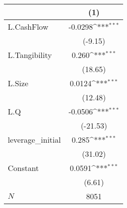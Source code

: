 {
\def\sym#1{\ifmmode^{#1}\else\(^{#1}\)\fi}
\begin{tabular}{l*{1}{c}}
\hline\hline
            &\multicolumn{1}{c}{(1)}         \\
\hline
L.CashFlow  &     -0.0298\sym{***}\\
            &     (-9.15)         \\
L.Tangibility&       0.260\sym{***}\\
            &     (18.65)         \\
L.Size      &      0.0124\sym{***}\\
            &     (12.48)         \\
L.Q         &     -0.0506\sym{***}\\
            &    (-21.53)         \\
leverage\_initial&       0.285\sym{***}\\
            &     (31.02)         \\
Constant    &      0.0591\sym{***}\\
            &      (6.61)         \\
\hline
\(N\)       &        8051         \\
\hline\hline
\end{tabular}
}

